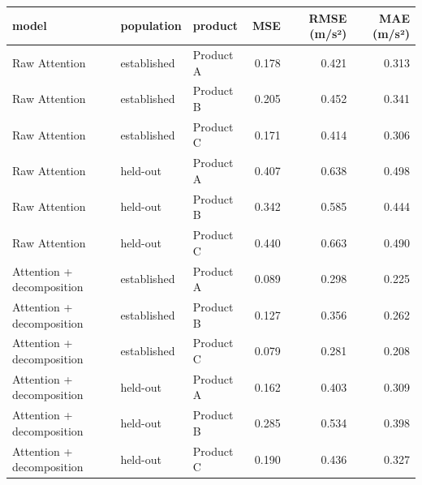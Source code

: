 \begin{tabular}{lllrrr}
\toprule
model & population & product & MSE & RMSE (m/s²) & MAE (m/s²) \\
\midrule
Raw Attention & established & Product A & 0.178 & 0.421 & 0.313 \\
Raw Attention & established & Product B & 0.205 & 0.452 & 0.341 \\
Raw Attention & established & Product C & 0.171 & 0.414 & 0.306 \\
Raw Attention & held-out & Product A & 0.407 & 0.638 & 0.498 \\
Raw Attention & held-out & Product B & 0.342 & 0.585 & 0.444 \\
Raw Attention & held-out & Product C & 0.440 & 0.663 & 0.490 \\
Attention + decomposition & established & Product A & 0.089 & 0.298 & 0.225 \\
Attention + decomposition & established & Product B & 0.127 & 0.356 & 0.262 \\
Attention + decomposition & established & Product C & 0.079 & 0.281 & 0.208 \\
Attention + decomposition & held-out & Product A & 0.162 & 0.403 & 0.309 \\
Attention + decomposition & held-out & Product B & 0.285 & 0.534 & 0.398 \\
Attention + decomposition & held-out & Product C & 0.190 & 0.436 & 0.327 \\
\bottomrule
\end{tabular}
